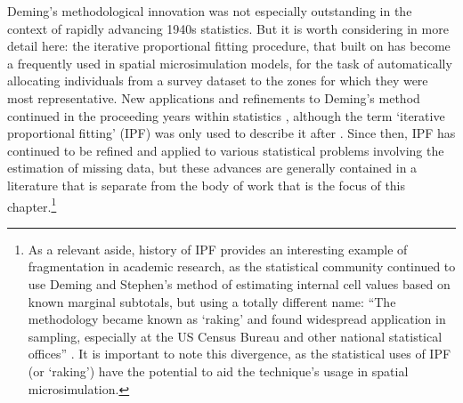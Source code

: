 Deming's methodological innovation was not especially outstanding in the
context of rapidly advancing 1940s statistics. But it is worth considering in
more detail here: the iterative proportional fitting procedure, that built on
\citep{Deming1940} has become a frequently used in spatial microsimulation
models, for the task of automatically allocating individuals from a survey
dataset to the zones for which they were most representative.
New applications and refinements to Deming's method continued in the
proceeding years within statistics
\citep{stephan1942iterative,Friedlander1961-ipf}, although the term `iterative
proportional fitting' (IPF) was only used to describe it after
\citet{Fienberg1970}. Since then, IPF has continued to be refined and applied to
various statistical problems involving the estimation of missing data, but
these advances are generally contained in a literature that is separate from
the body of work that is the focus of this
chapter.\footnote{As
a relevant
aside, history of IPF provides an interesting example of fragmentation in
academic research, as the statistical community continued to use Deming and
Stephen's method of estimating internal cell values based on known marginal
subtotals,
but using a totally different name: ``The methodology became known as `raking'
and found widespread application in sampling, especially at the US Census Bureau
and other national statistical offices''  \citet{Fienberg2007}. It is important
to note this divergence, as the statistical uses of IPF (or `raking') have the
potential to aid the technique's usage in spatial microsimulation.
}

